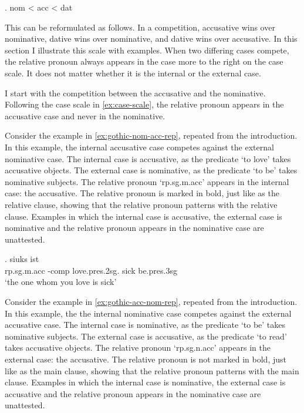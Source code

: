 \ex. \ac{nom} < \ac{acc} < \ac{dat}\label{ex:case-scale}

This can be reformulated as follows. In a competition, accusative wins over nominative, dative wins over nominative, and dative wins over accusative. In this section I illustrate this scale with examples. When two differing cases compete, the relative pronoun always appears in the case more to the right on the case scale. It does not matter whether it is the internal or the external case.

I start with the competition between the accusative and the nominative. Following the case scale in \ref{ex:case-scale}, the relative pronoun appears in the accusative case and never in the nominative.

Consider the example in \ref{ex:gothic-nom-acc-rep}, repeated from the introduction. In this example, the internal accusative case competes against the external nominative case.
The internal case is accusative, as the predicate  `to love' takes accusative objects.
The external case is nominative, as the predicate  `to be' takes nominative subjects.
The relative pronoun  `\ac{rp}.\ac{sg}.\ac{m}.\ac{acc}' appears in the internal case: the accusative. The relative pronoun is marked in bold, just like as the relative clause, showing that the relative pronoun patterns with the relative clause.
Examples in which the internal case is accusative, the external case is nominative and the relative pronoun appears in the nominative case are unattested.

\exg.    siuks ist\\
 \ac{rp}.\ac{sg}.\ac{m}.\ac{acc} -\ac{comp} love.\ac{pres}.2\ac{sg}.\scsub{[acc]} sick be.\ac{pres}.3\ac{sg}\scsub{[nom]}\\
 `the one whom you love is sick' \label{ex:gothic-nom-acc-rep}

Consider the example in \ref{ex:gothic-acc-nom-rep}, repeated from the introduction. In this example, the the internal nominative case competes against the external accusative case.
The internal case is nominative, as the predicate  `to be' takes nominative subjects.
The external case is accusative, as the predicate  `to read' takes accusative objects.
The relative pronoun  `\ac{rp}.\ac{sg}.\ac{n}.\ac{acc}' appears in the external case: the accusative. The relative pronoun is not marked in bold, just like as the main clause, showing that the relative pronoun patterns with the main clause.
Examples in which the internal case is nominative, the external case is accusative and the relative pronoun appears in the nominative case are unattested.

